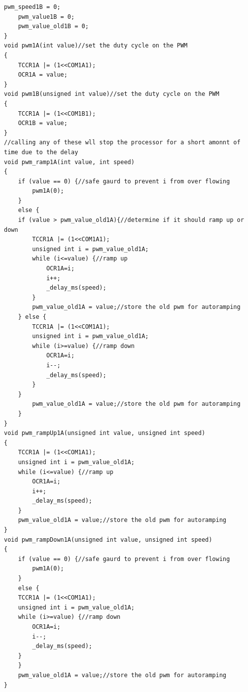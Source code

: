 \documentclass{article}
\begin{document}
\begin{lstlisting}[caption={The PWM function library.},label=pwm,frame=tbl]
    pwm_speed1B = 0;
    pwm_value1B = 0;
    pwm_value_old1B = 0;
}
void pwm1A(int value)//set the duty cycle on the PWM
{
    TCCR1A |= (1<<COM1A1);
    OCR1A = value;
}
void pwm1B(unsigned int value)//set the duty cycle on the PWM
{
    TCCR1A |= (1<<COM1B1);
    OCR1B = value;
}
//calling any of these wll stop the processor for a short amonnt of time due to the delay
void pwm_ramp1A(int value, int speed)
{
    if (value == 0) {//safe gaurd to prevent i from over flowing
        pwm1A(0);
    }
    else {
    if (value > pwm_value_old1A){//determine if it should ramp up or down
        TCCR1A |= (1<<COM1A1);
        unsigned int i = pwm_value_old1A;
        while (i<=value) {//ramp up
            OCR1A=i;
            i++;
            _delay_ms(speed);
        }
        pwm_value_old1A = value;//store the old pwm for autoramping
    } else {
        TCCR1A |= (1<<COM1A1);
        unsigned int i = pwm_value_old1A;
        while (i>=value) {//ramp down
            OCR1A=i;
            i--;
            _delay_ms(speed);
        }
    }
        pwm_value_old1A = value;//store the old pwm for autoramping
    }
}
void pwm_rampUp1A(unsigned int value, unsigned int speed)
{
    TCCR1A |= (1<<COM1A1);
    unsigned int i = pwm_value_old1A;
    while (i<=value) {//ramp up
        OCR1A=i;
        i++;
        _delay_ms(speed);
    }
    pwm_value_old1A = value;//store the old pwm for autoramping
}
void pwm_rampDown1A(unsigned int value, unsigned int speed)
{
    if (value == 0) {//safe gaurd to prevent i from over flowing
        pwm1A(0);
    }
    else {
    TCCR1A |= (1<<COM1A1);
    unsigned int i = pwm_value_old1A;
    while (i>=value) {//ramp down
        OCR1A=i;
        i--;
        _delay_ms(speed);
    }
    }
    pwm_value_old1A = value;//store the old pwm for autoramping
}



\end{lstlisting}
\end{document}
